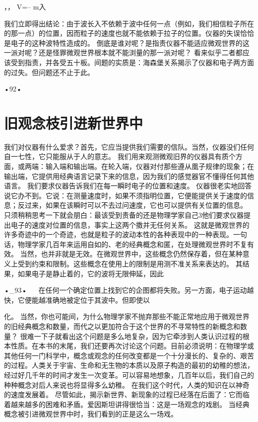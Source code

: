，，
V=--
m入

我们立即得出结论：由于波长入不依赖于波中任何一点（例如，我们相信粒子所在的那一点）的位置，因而粒子的速度也就不能依赖于拉子的位置。仪器的失误恰恰是电子的这种波特性造成的。
倒底是谁对呢？是指责仪器不能适应微观世界的这一派对呢？还是怪罪微观世界根本就不能浏量的那一派对呢？
看来似乎二者都应该受到指责，并各受五十板。间题的实质是：海森堡关系揭示了仪器和电子两方面的过失。但问题还不止于此。

•92•
  
\section{旧观念枝引进新世界中}

我们对仪器有什么爱求？首先，它应当提供我们需要的信队。当然，仪器没们任何自一七性，它只能服从于人的意志。
我们用来观测微观旧界的仪器具有质个方面，或两端：输入端和输出端。在轮入端，仪器对付那些遵从凰子规律的现象；在输出端，它提供用经典语言记录下来的信息，因为我们的感觉器官不懂得任何其他语言。
我们要求仪器告诉我们在每一瞬时电子的位置和速度。
仪器很老实地回答说它办不到。它说：在测量速度时，如果不须指明位置，它便能提供关于速度的信息；反过来，如果在该瞬时可以不去过问速度，它也可以提供有关位置的信息。
只须稍稍思考一下就会朋白：最该受到责备的还是物理学家自己3他们要求仪器提出电子的速度对位置的信息，事实上这两个擞并无任何关系。
这就是微观世界的许多奇迹中的一个奇迹，也就是粒子的波动本性的各种表现中的一种表现。一句话，物理学家几百年来运用自如的、老的经典概念和匿，在处理微观世界时不复有效。
当然，也并非就是无效。在微观世界中，这些概念仍然保存着，但在某种意义上受到约束和限制。这些概念在使用上的限制是用测不准关系来表达的。
其结果，如果电子是静止着的，它的波将无限伸延，因此

•_93•
  
在任何一个确定位置上找到它的企图都将失败。另一方面，电子运动越快，它便能越准确地被定位于其波中。但即使以

 

 

化。
当然，你也可能间，为什么物理学家不抛弃那些不能正常地应用于微观世界的旧经典概念和数量，而代之以更加符合于这个世界的不寻常特性的新概念和数量？
很难一下子就看出这个问题是多么地复杂，因为它牵涉到人类认识过程的根本性质。在本书的末尾，我们还要再次讨论这个问题。目前必须说明：在物理学或其他任何一门科学中，概念或观念的任何改变都是一个十分漫长的、复杂的、艰苦的过程。人类关于宇宙、生命和无生物的本质以及原子构造的最初的幼稚的想法，经过好几千年的时间才发生一次变革。可以容易地想象，几百年以后，我们自己的种种概念对后人来说也将显得多么幼稚。
在我们这个时代，人类的知识在以神奇的速度发展着。
尽管如此，揭示新世界、新现象的过程已经落在后面了：它而临着越来越多的困难和矛盾。爱因斯坦讲得很恰当：这是一场观念的戏剧。
当经典概念被引进微观世界中时，我们看到的正是这么一场戏。

